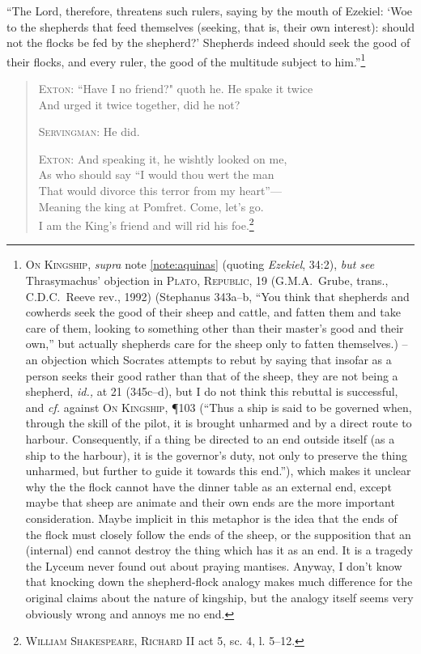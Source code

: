 \documentclass[../FGP.tex]{subfiles}
\begin{document}
``The Lord, therefore, threatens such rulers, saying by the mouth of Ezekiel: `Woe to the shepherds that feed themselves (seeking, that is, their own interest): should not the flocks be fed by the shepherd?' Shepherds indeed should seek the good of their flocks, and every ruler, the good of the multitude subject to him.''\footnote{\textsc{On Kingship}, \textit{supra} note \ref{note:aquinas} (quoting \textit{Ezekiel}, 34:2), \textit{but see} Thrasymachus' objection in \textsc{Plato, Republic}, 19 (G.M.A.~Grube, trans., C.D.C.~Reeve rev., 1992) (Stephanus 343a--b, ``You think that shepherds and cowherds seek the good of their sheep and cattle, and fatten them and take care of them, looking to something other than their master's good and their own,'' but actually shepherds care for the sheep only to fatten themselves.) -- an objection which Socrates attempts to rebut by saying that insofar as a person seeks their good rather than that of the sheep, they are not being a shepherd, \textit{id.,} at 21 (345c--d), but I do not think this rebuttal is successful, and \textit{cf.} against \textsc{On Kingship}, \P 103 (``Thus a ship is said to be governed when, through the skill of the pilot, it is brought unharmed and by a direct route to harbour. Consequently, if a thing be directed to an end outside itself (as a ship to the harbour), it is the governor’s duty, not only to preserve the thing unharmed, but further to guide it towards this end.''), which makes it unclear why the the flock cannot have the dinner table as an external end, except maybe that sheep are animate and their own ends are the more important consideration. Maybe implicit in this metaphor is the idea that the ends of the flock must closely follow the ends of the sheep, or the supposition that an (internal) end cannot destroy the thing which has it as an end. It is a tragedy the Lyceum never found out about praying mantises. Anyway, I don't know that knocking down the shepherd-flock analogy makes much difference for the original claims about the nature of kingship, but the analogy itself seems very obviously wrong and annoys me no end.}

\begin{verse}
\textsc{Exton:} 
``Have I no friend?" quoth he. He spake it twice\\
And urged it twice together, did he not?

\textsc{Servingman:}  He did.

\textsc{Exton:} And speaking it, he wishtly looked on me,\\
As who should say ``I would thou wert the man\\
That would divorce this terror from my heart''—\\
Meaning the king at Pomfret. Come, let’s go.\\
I am the King’s friend and will rid his foe.\footnote{\textsc{William Shakespeare, Richard II} act 5, sc. 4, l. 5--12.}
\end{verse}
\end{document}
